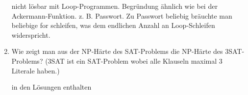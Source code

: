 \documentclass{bschlangaul-aufgabe}
\begin{document}
\begin{enumerate}
\begin{bAntwort}
nicht lösbar mit Loop-Programmen. Begründung ähnlich wie bei der
Ackermann-Funktion. z. B. Passwort. Zu Passwort beliebig bräuchte man
beliebige for schleifen, was dem endlichen Anzahl an Loop-Schleifen
widerspricht.
\end{bAntwort}



\item Wie zeigt man aus der NP-Härte des SAT-Problems die NP-Härte des
3SAT-Problems? (3SAT ist ein SAT-Problem wobei alle Klauseln maximal 3
Literale haben.)

\begin{bAntwort}
in den Lösungen enthalten
\end{bAntwort}

\end{enumerate}
\end{document}
